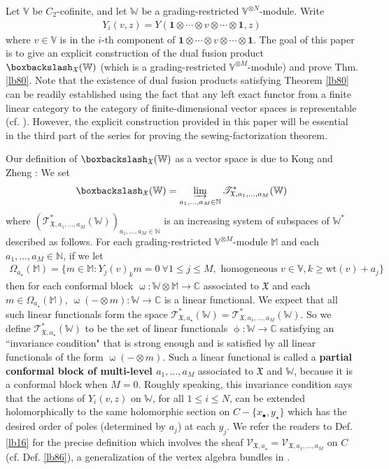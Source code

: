 \documentclass[11pt,b5paper,notitlepage]{article}
\theoremstyle{definition}
\theoremstyle{plain}
\newcommand{\fk}{\mathfrak}
\newcommand{\idt}{\mathbf{1}}
\newcommand{\scr}{\mathscr}
\newcommand{\blt}{\bullet}
\newcommand{\Vbb}{\mathbb V}
\newcommand{\Wbb}{\mathbb W}
\newcommand{\Mbb}{\mathbb M}
\newcommand{\Cbb}{\mathbb C}
\newcommand{\Nbb}{\mathbb N}
\newcommand{\wt}{\mathrm{wt}}
\newcommand{\<}{\left\langle}
\renewcommand{\>}{\right\rangle}
\newcommand{\fx}{\mathfrak{X}}
\newcommand{\bbs}{\boxbackslash}
\numberwithin{equation}{section}
\begin{document}
Let $\Vbb$ be $C_2$-cofinite, and let $\Wbb$ be a grading-restricted $\Vbb^{\otimes N}$-module. Write
\begin{align}
Y_i(v,z)=Y(\idt\otimes\cdots\otimes v\otimes\cdots\otimes \idt,z)
\end{align}
where $v\in\Vbb$ is in the $i$-th component of $\idt\otimes\cdots\otimes v\otimes\cdots\otimes \idt$. The goal of this paper is to give an explicit construction of the dual fusion product $\bbs_\fx(\Wbb)$ (which is a grading-restricted $\Vbb^{\otimes M}$-module) and prove Thm. \ref{lb80}. Note that the existence of dual fusion products satisfying Theorem \ref{lb80} can be readily established using the fact that any left exact functor from a finite linear category to the category of finite-dimensional vector spaces is representable (cf. \cite[Cor. 1.10]{DSPS19-balanced}). However, the explicit construction provided in this paper will be essential in the third part of the series for proving the sewing-factorization theorem.

Our definition of $\bbs_\fx(\Wbb)$ as a vector space is due to Kong and Zheng \cite{KZ-conformal-block}: We set
\begin{align*}
\bbs_\fx(\Wbb)=\varinjlim_{a_1,\dots,a_M\in\Nbb}\scr T_{\fx,a_1,\dots,a_M}^*(\Wbb)
\end{align*}
where $(\scr T_{\fx,a_1,\dots,a_M}^*(\Wbb))_{a_1,\dots,a_M\in\Nbb}$ is an increasing system of subspaces of $\Wbb^*$ described as follows. For each grading-restricted $\Vbb^{\otimes M}$-module $\Mbb$ and each $a_1,\dots,a_M\in\Nbb$, if we let
\begin{align*}
\Omega_{a_\star}(\Mbb)=\{m\in \Mbb:Y_j(v)_km=0~\forall 1\leq j\leq M,\text{ homogeneous }v\in\Vbb,k\geq\wt(v)+a_j\}
\end{align*}
then for each conformal block $\upomega:\Wbb\otimes\Mbb\rightarrow\Cbb$ associated to $\fx$ and each $m\in\Omega_{a_\star}(\Mbb)$, $\upomega(-\otimes m):\Wbb\rightarrow\Cbb$ is a linear functional. We expect that all such linear functionals form the space $\scr T_{\fx,a_\star}^*(\Wbb)=\scr T_{\fx,a_1,\dots,a_M}^*(\Wbb)$. So we define $\scr T_{\fx,a_\star}^*(\Wbb)$ to be the set of linear functionals $\upphi:\Wbb\rightarrow\Cbb$ satisfying an ``invariance condition" that is strong enough and is satisfied by all linear functionals of the form $\upomega(-\otimes m)$. Such a linear functional is called a \textbf{partial conformal block of multi-level $a_1,\dots,a_M$} associated to $\fk X$ and $\Wbb$, because it is a conformal block when $M=0$. Roughly speaking, this invariance condition says that the actions of $Y_i(v,z)$ on $\Wbb$, for all $1\leq i\leq N$, can be extended holomorphically to the same holomorphic section on $C-\{x_\blt,y_\star\}$ which has the desired order of poles (determined by $a_j$) at each $y_j$. We refer the readers to Def. \ref{lb16} for the precise definition which involves the sheaf $\scr V_{\fx,a_\star}=\scr V_{\fx,a_1,\dots,a_M}$ on $C$ (cf. Def. \ref{lb86}), a generalization of the vertex algebra bundles in \cite[Ch. 6]{FB04}. 
\end{document}
